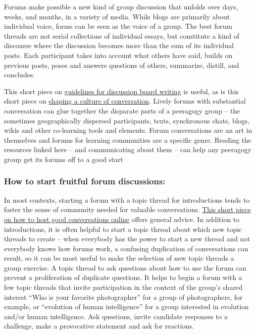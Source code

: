 Forums make possible a new kind of group discussion that unfolds over
days, weeks, and months, in a variety of media. While blogs are
primarily about individual voice, forms can be seen as the voice of a
group. The best forum threads are not serial collections of individual
essays, but constitute a kind of discourse where the discussion becomes
more than the sum of its individual posts. Each participant takes into
account what others have said, builds on previous posts, poses and
answers questions of others, summarize, distill, and concludes.

This short piece on
\href{http://www.lehigh.edu/~indiscus/doc_guidelines.html}{guidelines
for discussion board writing} is useful, as is this short piece on
\href{http://academiccommons.org/commons/essay/shaping-culture-conversation}{shaping
a culture of conversation}. Lively forums with substantial conversation
can glue together the disparate parts of a peeragogy group -- the
sometimes geographically dispersed participants, texts, synchronous
chats, blogs, wikis and other co-learning tools and elements. Forum
conversations are an art in themselves and forums for learning
communities are a specific genre. Reading the resources linked here --
and communicating about them -- can help any peeragogy group get its
forums off to a good start

\subsubsection{How to start fruitful forum
discussions:}\label{how-to-start-fruitful-forum-discussions}

In most contexts, starting a forum with a topic thread for introductions
tends to foster the sense of community needed for valuable
conversations.
\href{http://www.rheingold.com/texts/artonlinehost.html}{This short
piece on how to host good conversations online} offers general advice.
In addition to introductions, it is often helpful to start a topic
thread about which new topic threads to create -- when everybody has the
power to start a new thread and not everybody knows how forums work, a
confusing duplication of conversations can result, so it can be most
useful to make the selection of new topic threads a group exercise. A
topic thread to ask questions about how to use the forum can prevent a
proliferation of duplicate questions. It helps to begin a forum with a
few topic threads that invite participation in the context of the
group's shared interest ``Who is your favorite photographer'' for a
group of photographers, for example, or ``evolution of human
intelligence'' for a group interested in evolution and/or human
intelligence. Ask questions, invite candidate responses to a challenge,
make a provocative statement and ask for reactions.

